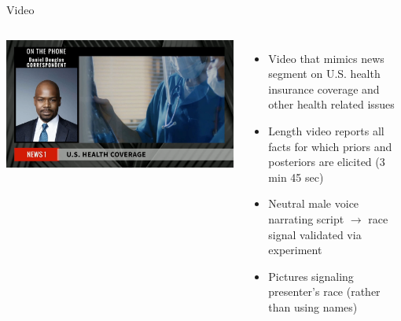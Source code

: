 \documentclass[10pt]{beamer}
\begin{document}
  
  \begin{frame}{Video}
\label{Video_info}

	\begin{columns}
		\includegraphics[width=1\textwidth]{img/Frame-13-08-2023-09-04-37.png}
	\begin{itemize}
 		\item Video that mimics news segment on U.S. health insurance coverage and other health related issues
            \item Length video reports all facts for which priors and posteriors are elicited (3 min 45 sec)
	    \item Neutral male voice narrating script $\rightarrow$ race signal validated via experiment
	    \item Pictures signaling presenter's race (rather than using names)
	\end{itemize}
	\end{columns}
	
  \hfill \hyperlink{facts}{} \hyperlink{voice}{} 
  \hyperlink{cheating}{}
	

\end{frame}
\end{document}
